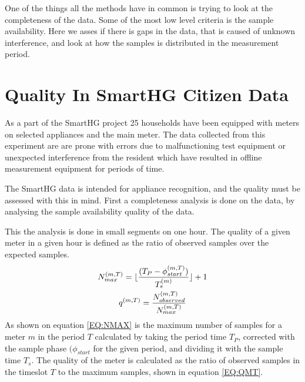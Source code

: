 One of the things all the methods have in common is trying to look at the completeness of the data. Some of the most low level criteria is the sample availability. Here we asses if there is gaps in the data, that is caused of unknown interference, and look at how the samples is distributed in the measurement period.  


\section{Quality In SmartHG Citizen Data}
As a part of the SmartHG project 25 households have been equipped with meters on selected appliances and the main meter. The data collected from this experiment are are prone with errors due to malfunctioning test equipment or unexpected interference from the resident which have resulted in offline measurement equipment for periods of time. 

The SmartHG data is intended for appliance recognition, and the quality must be assessed with this in mind. First a completeness analysis is done on the data, by analysing the sample availability quality of the data. 

This the analysis is done in small segments on one hour. The quality of a given meter in a given hour is defined as the ratio of observed samples over the expected samples. 
\begin{gather}
		N_{max}^{(m,T)} = \lfloor \frac{(T_{P}-\phi_{start}^{(m,T)})}{T_s^{(m)}}\rfloor + 1 \label{EQ:NMAX} \\
		q^{(m,T)} = \frac{N_{observed}^{(m,T)}}{ N_{max}^{(m,T)} } \label{EQ:QMT}
\end{gather}
As shown on equation \ref{EQ:NMAX} is the maximum number of samples for a meter $m$ in the period $T$ calculated by taking the period time $T_P$, corrected with the sample phase $(\phi_{start}$ for the given period, and dividing it with the sample time $T_s$. The quality of the meter is calculated as the ratio of observed samples in the timeslot $T$ to the maximum samples, shown in equation \ref{EQ:QMT}. 


